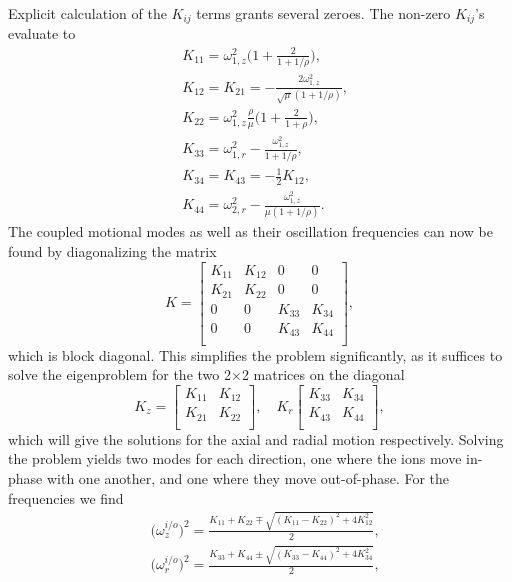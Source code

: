 Explicit calculation of the $K_{ij}$ terms grants several zeroes. The non-zero $K_{ij}$'s evaluate to
\begin{align}
    &K_{11} = \omega_{1,z}^2\bigg(1+\frac{2}{1+1/\rho}\bigg),\\
    &K_{12} = K_ {21} = -\frac{2\omega_{1,z}^2}{\sqrt{\mu}(1+1/\rho)},\\
    &K_{22} = \omega_{1,z}^2\frac{\rho}{\mu}\bigg(1+\frac{2}{1+\rho}\bigg),\\
    &K_{33} = \omega_{1,r}^2 - \frac{\omega_{1,z}^2}{1+1/\rho},\\
    &K_{34} = K_{43} = -\frac{1}{2}K_{12},\\
    &K_{44} = \omega_{2,r}^2-\frac{\omega_{1,z}^2}{\mu(1+1/\rho)}.
\end{align}
The coupled motional modes as well as their oscillation frequencies can now be found by diagonalizing the matrix \cite{Taylor[2005]}
\begin{equation}
    K = \begin{bmatrix}
        K_{11} & K_{12} & 0 & 0\\
        K_{21} & K_{22} & 0 & 0\\
        0 & 0 & K_{33} & K_{34}\\
        0 & 0 & K_{43} & K_{44}\\
    \end{bmatrix},
\end{equation}
which is block diagonal. This simplifies the problem significantly, as it suffices to solve the eigenproblem for the two 2$\times$2 matrices on the diagonal
\begin{equation}
    K_{z} = \begin{bmatrix}
        K_{11} & K_{12}\\
        K_{21} & K_{22}\\
    \end{bmatrix},
    \quad
    K_{r}
    \begin{bmatrix}
        K_{33} & K_{34}\\
        K_{43} & K_{44}\\
    \end{bmatrix},
\end{equation}
which will give the solutions for the axial and radial motion respectively.
Solving the problem yields two modes for each direction, one where the ions move in-phase with one another, and one where they move out-of-phase.
For the frequencies we find
\begin{align}
    &\big(\omega_z^{i/o}\big)^2 = \frac{K_{11}+K_{22}\mp\sqrt{(K_{11}-K_{22})^2+4K_{12}^2}}{2},\\
    &\big(\omega_r^{i/o}\big)^2 = \frac{K_{33}+K_{44}\pm\sqrt{(K_{33}-K_{44})^2+4K_{34}^2}}{2},
\end{align}
